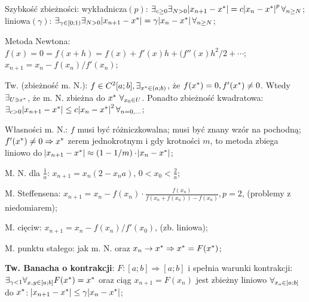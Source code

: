 


\entry
Szybkość zbieżności:
wykładnicza$(p)$:
$\exists_{c \geq 0} \exists_{N > 0}
\abs{x_{n + 1} - x^{*}} = c \abs{x_n - x^{*}}^p \forall_{n \geq N}$;
liniowa$(\gamma)$:
$\exists_{\gamma \in [0;1)} \exists_{N > 0}
\abs{x_{n + 1} - x^{*}} = \gamma \abs{x_n - x^{*}} \forall_{n \geq N}$;

\entry
Metoda Newtona:
$f(x) = 0 = f(x+h) = f(x) + f'(x)h + (f''(x)h^2/2+\cdots$;
$x_{n+1} = x_n - f(x_n)/f'(x_n)$;

\entry
Tw. (zbieżność m. N.):
$f \in C^2[a;b], \exists_{x^{*} \in (a;b)}$,
że $f(x^{*})=0, f'(x^{*}) \neq 0$.
Wtedy $\exists_{U \ni x^{*}}$, że m. N. zbieżna do $x^{*} \ \forall_{x_0 \in U}$.
Ponadto zbieżność kwadratowa:
$\exists_{c>0} \abs{x_{n+1} - x^{*}} \leq c \abs{x_n - x^{*}}^2 \forall_{n=0,\ldots}$;

\entry
Własności m. N.:
\subentry
$f$ musi być różniczkowalna;
\subentry
musi być znany wzór na pochodną;
\subentry
$f'(x^{*}) \neq 0 \Rightarrow x^{*}$ zerem jednokrotnym i gdy krotności $m$, 
to metoda zbiega liniowo do 
$\abs{x_{n+1} - x^{*}} \approx (1-1/m) \cdot \abs{x_n - x^{*}}$;

\entry
M. N. dla
$\frac{1}{a}$: $x_{n+1} = x_n(2 - x_na)$, $0<x_0<\frac{2}{a}$;



\entry
M. Steffensena:
$x_{n+1} = x_n - f(x_n) \cdot \frac{f(x_n)}{f(x_n + f(x_n)) - f(x_n)}, p=2$,
(problemy z niedomiarem);

\entry
M. cięciw:
$x_{n+1} = x_n - f(x_n)/f'(x_0)$, (zb. liniowa);


\entry
M. punktu stałego:
jak m. N. oraz
$x_n \rightarrow x^{*} \Rightarrow x^{*} = F(x^{*})$;

\entry
\textbf{Tw. Banacha o kontrakcji}:
$F:[a;b] \Rightarrow [a;b]$
i spełnia warunki kontrakcji:
$\exists_{\gamma < 1} \forall_{x,y \in [a;b]} F(x^{*}) = x^{*}$
oraz ciąg 
$x_{n+1} = F(x_n)$ 
jest zbieżny liniowo 
$\forall_{x_o \in [a;b]}$
do $x^{*}$:
$\abs{x_{n+1} - x^{*}} \leq \gamma \abs{x_n - x^{*}}$;
